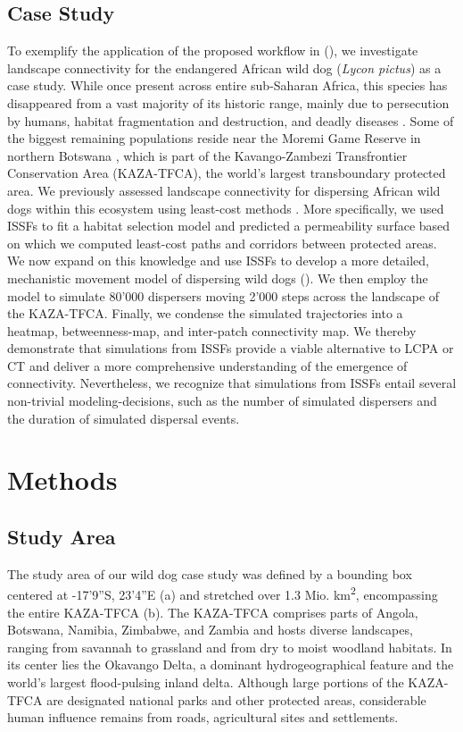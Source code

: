 \documentclass[abstract=on,10pt,a4paper,bibliography=totocnumbered]{article}
\begin{document}
\subsection{Case Study}
To exemplify the application of the proposed workflow in
(), we investigate landscape connectivity for the
endangered African wild dog (\textit{Lycon pictus}) as a case study. While once
present across entire sub-Saharan Africa, this species has disappeared from a
vast majority of its historic range, mainly due to persecution by humans,
habitat fragmentation and destruction, and deadly diseases
\citep{Woodroffe.2012}. Some of the biggest remaining populations reside near
the Moremi Game Reserve in northern Botswana \citep{McNutt.1996, Cozzi.2013,
Behr.2020}, which is part of the Kavango-Zambezi Transfrontier Conservation Area
(KAZA-TFCA), the world's largest transboundary protected area. We previously
assessed landscape connectivity for dispersing African wild dogs within this
ecosystem using least-cost methods \citep{Hofmann.2021}. More specifically, we
used ISSFs to fit a habitat selection model and predicted a permeability surface
based on which we computed least-cost paths and corridors between protected
areas. We now expand on this knowledge and use ISSFs to develop a more detailed,
mechanistic movement model of dispersing wild dogs ().
We then employ the model to simulate 80'000 dispersers moving 2'000 steps across
the landscape of the KAZA-TFCA. Finally, we condense the simulated trajectories
into a heatmap, betweenness-map, and inter-patch connectivity map. We thereby
demonstrate that simulations from ISSFs provide a viable alternative to LCPA or
CT and deliver a more comprehensive understanding of the emergence of
connectivity. Nevertheless, we recognize that simulations from ISSFs entail
several non-trivial modeling-decisions, such as the number of simulated
dispersers and the duration of simulated dispersal events.

\section{Methods}
\subsection{Study Area}
The study area of our wild dog case study was defined by a bounding box centered
at -17'9''S, 23'4''E (a) and stretched over
1.3 Mio. km\textsuperscript{2}, encompassing the entire KAZA-TFCA
(b). The KAZA-TFCA comprises parts of Angola, Botswana, Namibia,
Zimbabwe, and Zambia and hosts diverse landscapes, ranging from savannah to
grassland and from dry to moist woodland habitats. In its center lies the
Okavango Delta, a dominant hydrogeographical feature and the world's largest
flood-pulsing inland delta. Although large portions of the KAZA-TFCA are
designated national parks and other protected areas, considerable human
influence remains from roads, agricultural sites and settlements.
\end{document}
